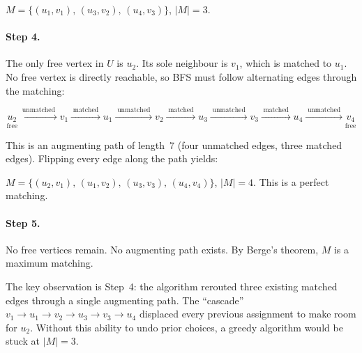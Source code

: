 \documentclass[11pt]{article}
\begin{document}
$M = \{(u_1, v_1),\, (u_3, v_2),\, (u_4, v_3)\}$, $|M| = 3$.

\paragraph{Step 4.}
The only free vertex in $U$ is $u_2$.  Its sole neighbour is
$v_1$, which is matched to $u_1$.  No free vertex is directly
reachable, so BFS must follow alternating edges through the
matching:

\[
  \underset{\text{free}}{u_2}
  \xrightarrow{\;\text{unmatched}\;}
  v_1
  \xrightarrow{\;\text{matched}\;}
  u_1
  \xrightarrow{\;\text{unmatched}\;}
  v_2
  \xrightarrow{\;\text{matched}\;}
  u_3
  \xrightarrow{\;\text{unmatched}\;}
  v_3
  \xrightarrow{\;\text{matched}\;}
  u_4
  \xrightarrow{\;\text{unmatched}\;}
  \underset{\text{free}}{v_4}
\]

This is an augmenting path of length~7 (four unmatched edges,
three matched edges).  Flipping every edge along the path yields:

\begin{center}
\end{center}

$M = \{(u_2, v_1),\, (u_1, v_2),\, (u_3, v_3),\, (u_4, v_4)\}$,
$|M| = 4$.  This is a perfect matching.

\paragraph{Step 5.}
No free vertices remain.  No augmenting path exists.  By Berge's
theorem, $M$ is a maximum matching.

\medskip
The key observation is Step~4: the algorithm rerouted three
existing matched edges through a single augmenting path.  The
``cascade'' $v_1 \to u_1 \to v_2 \to u_3 \to v_3 \to u_4$
displaced every previous assignment to make room for $u_2$.
Without this ability to undo prior choices, a greedy algorithm
would be stuck at $|M| = 3$.
\end{document}

